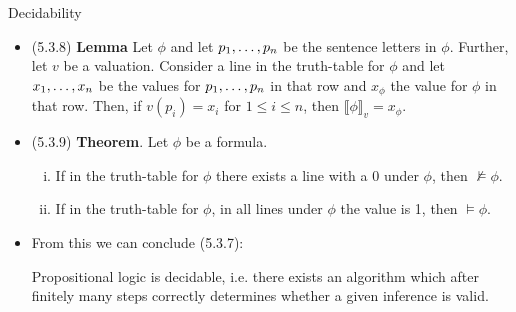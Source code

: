 \begin{frame}{Decidability}
	
	\begin{itemize}
	
		\item (5.3.8) \textbf{Lemma} Let $\phi$ and let $p_1, \mathellipsis, p_n$ be the sentence letters in $\phi$. Further, let $v$ be a valuation. Consider a line in the truth-table for $\phi$ and let $x_1, \mathellipsis, x_n$ be the values for $p_1, \mathellipsis, p_n$ in that row and $x_\phi$ the value for $\phi$ in that row. Then, if $v(p_i)=x_i$ for $1\leq i\leq n$, then $\llbracket \phi\rrbracket_v=x_\phi$.


		\item (5.3.9) \textbf{Theorem}. Let $\phi$ be a formula.
		
		\begin{enumerate}[(i)]
		
			\item  If in the truth-table for $\phi$ there exists a line with a 0 under $\phi$, then $\nvDash\phi$.
			
			\item  If in the truth-table for $\phi$, in all lines under $\phi$ the value is 1, then $\vDash\phi$.
		
		\end{enumerate}
		
		\item From this we can conclude (5.3.7):
		
		\begin{theorem}
	Propositional logic is decidable, i.e. there exists an algorithm which after finitely many steps correctly determines whether a given inference is valid.
	\end{theorem}

	
	\end{itemize}

\end{frame}

